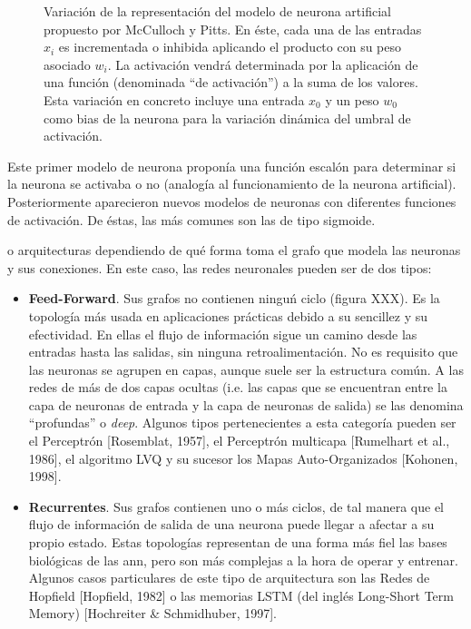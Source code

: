 \begin{figure}
	\caption[Modelo de neurona artificial de McCulloch y Pitts]{Variación de la representación del modelo de neurona artificial propuesto por McCulloch y Pitts. En éste, cada una de las entradas $x_i$ es incrementada o inhibida aplicando el producto con su peso asociado $w_i$. La activación vendrá determinada por la aplicación de una función (denominada \enquote{de activación}) a la suma de los valores. Esta variación en concreto incluye una entrada $x_0$ y un peso $w_0$ como bias de la neurona para la variación dinámica del umbral de activación.}
	\label{fig:mccullocs-pitts-neuron-model}
\end{figure}

Este primer modelo de neurona proponía una función escalón para determinar si la neurona se activaba o no (analogía al funcionamiento de la neurona artificial). Posteriormente aparecieron nuevos modelos de neuronas con diferentes funciones de activación. De éstas, las más comunes son las de tipo sigmoide.


 o arquitecturas dependiendo de qué forma toma el grafo que modela las neuronas y sus conexiones. En este caso, las redes neuronales pueden ser de dos tipos:

\begin{itemize}
	\item \textbf{Feed-Forward}. Sus grafos no contienen ninguń ciclo (figura XXX). Es la topología más usada en aplicaciones prácticas debido a su sencillez y su efectividad. En ellas el flujo de información sigue un camino desde las entradas hasta las salidas, sin ninguna retroalimentación. No es requisito que las neuronas se agrupen en capas, aunque suele ser la estructura común. A las redes de más de dos capas ocultas (i.e. las capas que se encuentran entre la capa de neuronas de entrada y la capa de neuronas de salida) se las denomina \enquote{profundas} o \textit{deep}. Algunos tipos pertenecientes a esta categoría pueden ser el Perceptrón [Rosemblat, 1957], el Perceptrón multicapa [Rumelhart et al., 1986], el algoritmo LVQ y su sucesor los Mapas Auto-Organizados [Kohonen, 1998].
	\item \textbf{Recurrentes}. Sus grafos contienen uno o más ciclos, de tal manera que el flujo de información de salida de una neurona puede llegar a afectar a su propio estado. Estas topologías representan de una forma más fiel las bases biológicas de las \ac{ann}, pero son más complejas a la hora de operar y entrenar. Algunos casos particulares de este tipo de arquitectura son las Redes de Hopfield [Hopfield, 1982] o las memorias LSTM (del inglés Long-Short Term Memory) [Hochreiter \& Schmidhuber, 1997].
\end{itemize}

